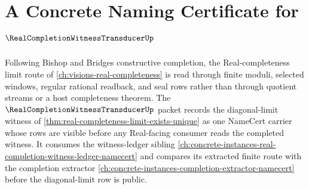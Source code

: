 \chapter{A Concrete Naming Certificate for $\RealCompletionWitnessTransducerUp$}
\label{ch:concrete-instances-real-completion-witness-transducer-namecert}

Following Bishop and Bridges constructive completion, the Real-completeness limit route of \autoref{ch:visions-real-completeness} is read through finite moduli, selected windows, regular rational readback, and seal rows rather than through quotient streams or a host completeness theorem. The $\RealCompletionWitnessTransducerUp$ packet records the diagonal-limit witness of \autoref{thm:real-completeness-limit-exists-unique} as one NameCert carrier whose rows are visible before any Real-facing consumer reads the completed witness. It consumes the witness-ledger sibling \autoref{ch:concrete-instances-real-completion-witness-ledger-namecert} and compares its extracted finite route with the completion extractor \autoref{ch:concrete-instances-completion-extractor-namecert} before the diagonal-limit row is public.

